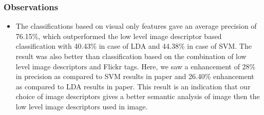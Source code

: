 \subsubsection*{Observations}
\begin{itemize}
\item The classifications based on visual only features gave an average precision of 76.15\%, which outperformed the low level image
descriptor based classification with 40.43\% in case of LDA and 44.38\% in case of SVM. The result was also better than classification based on the combination of low level image descriptors and Flickr tags. Here, we saw a enhancement of 28\% in precision as compared to SVM results in paper and 26.40\% enhancement as compared to LDA results in paper. This result is an indication that our choice of image descriptors gives a better semantic analysis of image then the low level image descriptors used in image.







\end{itemize}
